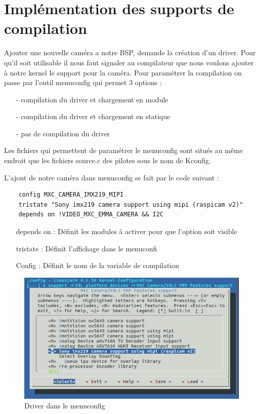 \section{Implémentation des supports de compilation}

Ajouter une nouvelle caméra a notre BSP, demande la création d’un driver. Pour qu’il soit
utilisable il nous faut signaler au compilateur que nous voulons ajouter à notre kernel le
support pour la caméra. Pour paramétrer la compilation on passe par l’outil menuconfig
qui permet 3 options :

\begin{itemize}
    \item[-] compilation du driver et chargement en module
    \item[-] compilation du driver et chargement en statique
    \item[-] pas de compilation du driver
\end{itemize}

Les fichiers qui permettent de paramétrer le menuconfig sont situés au même endroit que
les fichiers source.c des pilotes sous le nom de Kconfig.

L’ajout de notre caméra dans menuconfig se fait par le code suivant :

\begin{lstlisting}
    config MXC_CAMERA_IMX219_MIPI
    tristate "Sony imx219 camera support using mipi (raspicam v2)"
    depends on !VIDEO_MXC_EMMA_CAMERA && I2C
\end{lstlisting}

\begin{itemize}
    \item[depends on : ] Définit les modules à activer pour que l’option soit visible
    \item[tristate : ] Définit l’affichage dans le menuconfi
    \item[Config : ] Définit le nom de la variable de compilation
\end{itemize}

\begin{figure}[!htb]
    \centering
    \includegraphics[trim={0cm 0cm 0cm 0cm},clip,scale=0.4]{Figures/menuconfig.png}
    \decoRule
    \caption{Driver dans le menuconfig} \label{fig:menucfg}
\end{figure}

